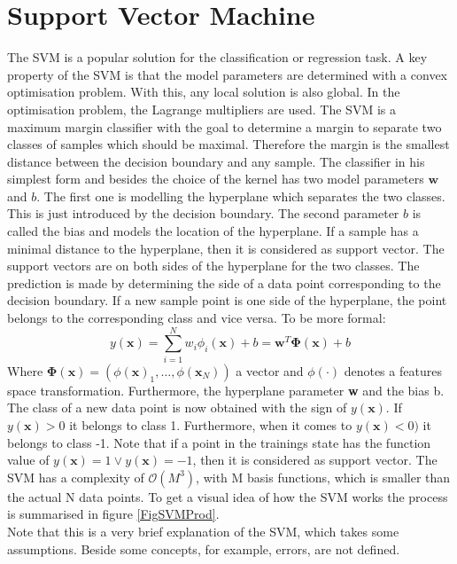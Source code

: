\section{Support Vector Machine}\label{PcSecSVM}
The \ac{SVM} is a popular solution for the classification or regression task.\cite[p. 325-337]{Bishop.2009}
A key property of the \acs{SVM} is that the model parameters are determined with a convex optimisation problem.
With this, any local solution is also global.
In the optimisation problem, the Lagrange multipliers are used.
The \acs{SVM} is a maximum margin classifier with the goal to determine a margin to separate two classes of samples which should be maximal. 
Therefore the margin is the smallest distance between the decision boundary and any sample.
The classifier in his simplest form and besides the choice of the kernel has two model parameters $\mathbf{w}$ and $b$. 
The first one is modelling the hyperplane which separates the two classes.
This is just introduced by the decision boundary. 
The second parameter $b$ is called the bias and models the location of the hyperplane.
If a sample has a minimal distance to the hyperplane, then it is considered as support vector.
The support vectors are on both sides of the hyperplane for the two classes.
The prediction is made by determining the side of a data point corresponding to the decision boundary.
If a new sample point is one side of the hyperplane, the point belongs to the corresponding class and vice versa. To be more formal: 
\begin{equation}\label{EqSVMPred}
y(\textbf{x}) = \sum_{i=1}^{N} w_i \phi_i(\mathbf{x}) + b= \textbf{w}^T \mathbf{\Phi}(\textbf{x}) + b
\end{equation}
Where $\mathbf{\Phi(x)}= (\phi(\mathbf{x})_1,\dots,\phi(\mathbf{x}_N))$ a vector and $\phi(\cdot)$ denotes a features space transformation.
Furthermore, the hyperplane parameter \textbf{w} and the bias b.
The class of a new data point is now obtained with the sign of $y(\textbf{x})$. If $y(\textbf{x}) > 0$ it belongs to class 1.
Furthermore, when it comes to $y(\textbf{x}) < 0)$ it belongs to class -1.
Note that if a point in the trainings state has the function value of $y(\textbf{x}) = 1 \vee y(\textbf{x}) = -1$, then it is considered as support vector.
The \ac{SVM} has a complexity of $\mathcal{O}(M^3)$, with M basis functions, which is smaller than the actual N data points.
To get a visual idea of how the \ac{SVM} works the process is summarised in figure \ref{FigSVMProd}. \\
Note that this is a very brief explanation of the \acs{SVM}, which takes some assumptions. Beside some concepts, for example, errors, are not defined.
